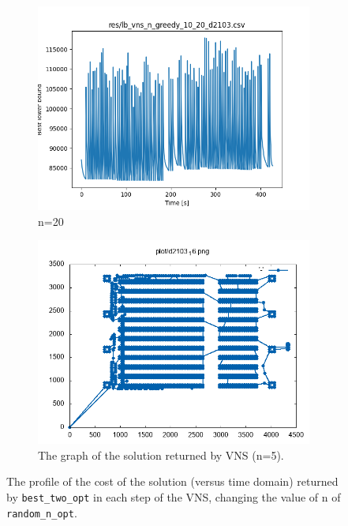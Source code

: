 \begin{figure}[!h]
\begin{subfigure}{.5\columnwidth}
		\includegraphics[width=\columnwidth]{../res/lb_vns_n_greedy_10_20_d2103.png}
		\caption{n=20}
		\label{fig:lb_vns_n_greedy_10_95_03_02_20_d2103}
	\end{subfigure}
	\begin{subfigure}{.5\columnwidth}
		\centering
		\includegraphics[width=\columnwidth]{../res/d2103_16.png}
		\caption{The graph of the solution returned by VNS (n=5).}
		\label{fig:d2103_16}
	\end{subfigure}
	\caption{The profile of the cost of the solution (versus time domain) returned by \texttt{best\_two\_opt} in each step of the VNS, changing the value of n of \texttt{random\_n\_opt}.}
	\label{fig:lb_vns}
\end{figure}
